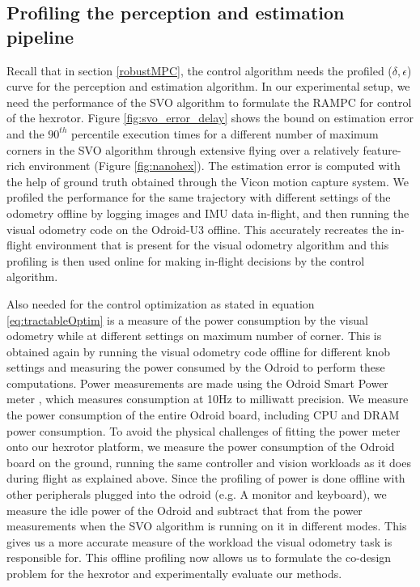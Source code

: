 

\subsection{Profiling the perception and estimation pipeline}

Recall that in section \ref{robustMPC}, the control algorithm needs the profiled ($\delta,\epsilon$) curve for the perception and estimation algorithm. In our experimental setup, we need the performance of the SVO algorithm to formulate the RAMPC for control of the hexrotor. Figure \ref{fig:svo_error_delay} shows the bound on estimation error and the $90^{th}$ percentile execution times for a different number of maximum corners in the SVO algorithm through extensive flying over a relatively feature-rich environment (Figure \ref{fig:nanohex}). The estimation error is computed with the help of ground truth obtained through the Vicon motion capture system. We profiled the performance for the same trajectory with different settings of the odometry offline by logging images and IMU data in-flight, and then running the visual odometry code on the Odroid-U3 offline.
This accurately recreates the in-flight environment that is present for the visual odometry algorithm and this profiling is then used online for making in-flight decisions by the control algorithm.

Also needed for the control optimization as stated in equation \ref{eq:tractableOptim} is a measure of the power consumption by the visual odometry while at different settings on maximum number of corner. This is obtained again by running the visual odometry code offline for different knob settings and measuring the power consumed by the Odroid to perform these computations. Power measurements are made using the Odroid Smart Power meter \cite{OdroidSmartPower}, which measures consumption at 10Hz to milliwatt precision. We measure the power consumption of the entire Odroid board, including CPU and DRAM power consumption. To avoid the physical challenges of fitting the power meter onto our hexrotor platform, we measure the power consumption of the Odroid board on the ground, running the same controller and vision workloads as it does during flight as explained above. Since the profiling of power is done offline with other peripherals plugged into the odroid (e.g. A monitor and keyboard), we measure the idle power of the Odroid and subtract that from the power measurements when the SVO algorithm is running on it in different modes. This gives us a more accurate measure of the workload the visual odometry task is responsible for. This offline profiling now allows us to formulate the co-design problem for the hexrotor and experimentally evaluate our methods.


